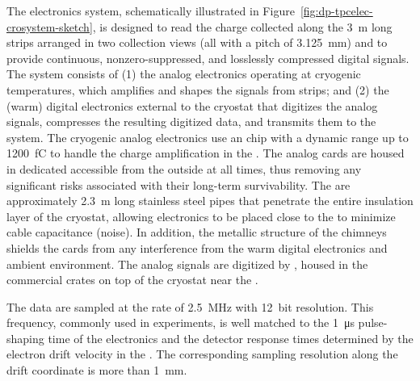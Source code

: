 The  electronics system, schematically illustrated in  Figure~\ref{fig:dp-tpcelec-crosystem-sketch}, is designed to read the charge collected along the \SI{3}{m} long  strips arranged in two collection views (all with a pitch of \SI{3.125}{mm}) and 
to provide continuous, nonzero-suppressed, and losslessly compressed digital signals.  
The system consists of (1) the  analog electronics operating at cryogenic temperatures, which amplifies and shapes the signals from  strips; and (2) the (warm) digital electronics external to the cryostat that digitizes the analog signals, compresses the resulting digitized data, and transmits them to the  system.  The cryogenic  analog electronics use an  chip with a dynamic range up to \SI{1200}{fC} to handle %
the charge amplification in the . The analog  cards are housed in dedicated  accessible from the outside at all times, thus removing any significant risks associated with their long-term survivability. The  are approximately \SI{2.3}{m} long stainless steel pipes that %
penetrate the entire insulation layer of the cryostat, allowing  electronics to be placed close to the  to minimize cable capacitance (noise).  In addition, the metallic structure of the chimneys shields the  cards from any interference from the warm digital electronics and ambient environment. The analog signals are digitized by , housed in the commercial  crates on top of the cryostat near the . 

The  data are sampled at the rate of \SI{2.5}{MHz} with \SI{12}{bit} resolution. This frequency, %
commonly used in  experiments, is well matched to the \SI{1}{\micro\second} pulse-shaping time of the  electronics and the detector response times determined by the electron drift velocity in the . The corresponding sampling resolution along the drift coordinate is more than \SI{1}{\mm}. 

